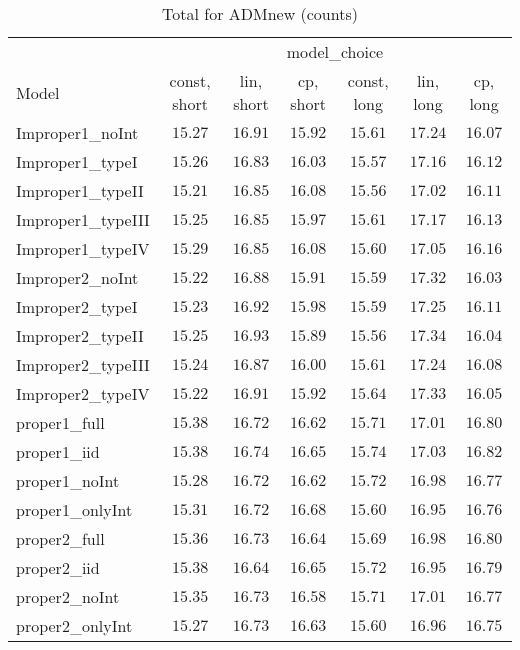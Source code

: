 \begin{table}

\caption{\label{tab:model-choice-sc18}Total for ADMnew (counts)}
\centering
\begin{tabular}{lcccccc}
\hline
 & \multicolumn{6}{c}{model_choice} \\ 
Model  & const, short & lin, short & cp, short & const, long & lin, long & \multicolumn{1}{c}{cp, long} \\ 
\hline
Improper1_noInt  & $15.27$ & $16.91$ & $15.92$ & $15.61$ & $17.24$ & $16.07$ \\
Improper1_typeI  & $15.26$ & $16.83$ & $16.03$ & $15.57$ & $17.16$ & $16.12$ \\
Improper1_typeII  & $15.21$ & $16.85$ & $16.08$ & $15.56$ & $17.02$ & $16.11$ \\
Improper1_typeIII  & $15.25$ & $16.85$ & $15.97$ & $15.61$ & $17.17$ & $16.13$ \\
Improper1_typeIV  & $15.29$ & $16.85$ & $16.08$ & $15.60$ & $17.05$ & $16.16$ \\
Improper2_noInt  & $15.22$ & $16.88$ & $15.91$ & $15.59$ & $17.32$ & $16.03$ \\
Improper2_typeI  & $15.23$ & $16.92$ & $15.98$ & $15.59$ & $17.25$ & $16.11$ \\
Improper2_typeII  & $15.25$ & $16.93$ & $15.89$ & $15.56$ & $17.34$ & $16.04$ \\
Improper2_typeIII  & $15.24$ & $16.87$ & $16.00$ & $15.61$ & $17.24$ & $16.08$ \\
Improper2_typeIV  & $15.22$ & $16.91$ & $15.92$ & $15.64$ & $17.33$ & $16.05$ \\
proper1_full  & $15.38$ & $16.72$ & $16.62$ & $15.71$ & $17.01$ & $16.80$ \\
proper1_iid  & $15.38$ & $16.74$ & $16.65$ & $15.74$ & $17.03$ & $16.82$ \\
proper1_noInt  & $15.28$ & $16.72$ & $16.62$ & $15.72$ & $16.98$ & $16.77$ \\
proper1_onlyInt  & $15.31$ & $16.72$ & $16.68$ & $15.60$ & $16.95$ & $16.76$ \\
proper2_full  & $15.36$ & $16.73$ & $16.64$ & $15.69$ & $16.98$ & $16.80$ \\
proper2_iid  & $15.38$ & $16.64$ & $16.65$ & $15.72$ & $16.95$ & $16.79$ \\
proper2_noInt  & $15.35$ & $16.73$ & $16.58$ & $15.71$ & $17.01$ & $16.77$ \\
proper2_onlyInt  & $15.27$ & $16.73$ & $16.63$ & $15.60$ & $16.96$ & $16.75$ \\
\hline 
\end{tabular}


\end{table}